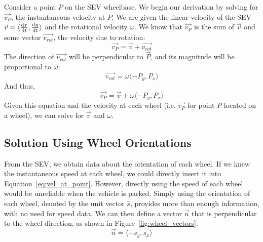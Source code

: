 \documentclass{article}
\begin{document}
Consider a point $P$ on the SEV wheelbase. We begin our derivation by solving for $\vec{v_P}$, the instantaneous velocity at $P$. We are given the linear velocity of the SEV $\vec{v}=\langle \frac{\mathrm{d}x}{\mathrm{d}t}, \frac{\mathrm{d}y}{\mathrm{d}t} \rangle$ and the rotational velocity $\omega$. We know that $\vec{v_P}$ is the sum of $\vec{v}$ and some vector $\vec{v_{rot}}$, the velocity due to rotation:
\begin{equation*}
    \vec{v_P}=\vec{v}+\vec{v_{rot}}
\end{equation*}
The direction of $\vec{v_{rot}}$ will be perpendicular to $\vec{P}$, and its magnitude will be proportional to $\omega$:
\begin{equation*}
    \vec{v_{rot}}=\omega \langle -P_y, P_x \rangle
\end{equation*}
And thus,
\begin{equation}
\label{eq:vel_at_point}
    \vec{v_P} = \vec{v} + \omega \langle -P_y, P_x \rangle
\end{equation}
Given this equation and the velocity at each wheel (i.e. $\vec{v_P}$ for point $P$ located on a wheel), we can solve for $\vec{v}$ and $\omega$.

\subsection{Solution Using Wheel Orientations}
From the SEV, we obtain data about the orientation of each wheel. If we knew the instantaneous speed at each wheel, we could directly insert it into Equation~\ref{eq:vel_at_point}. However, directly using the speed of each wheel would be unreliable when the vehicle is parked. Simply using the orientation of each wheel, denoted by the unit vector $\hat{s}$, provides more than enough information, with no need for speed data. We can then define a vector $\vec{n}$ that is perpendicular to the wheel direction, as shown in Figure~\ref{fig:wheel_vectors}.
\begin{equation*}
    \vec{n} = \langle -s_y, s_x \rangle
\end{equation*}
\end{document}
